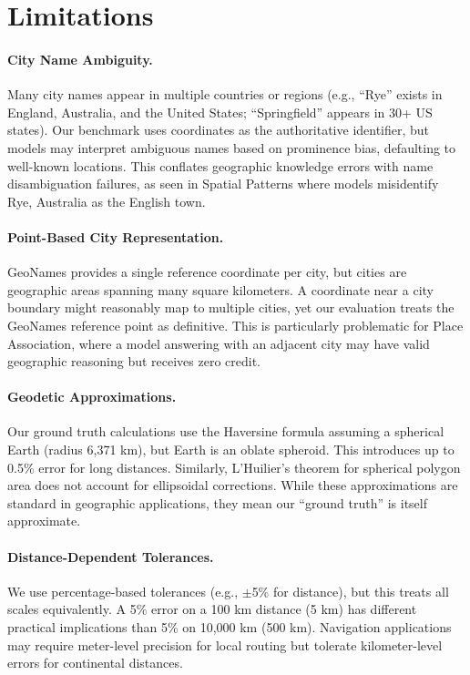 \section{Limitations}
\label{sec:limitations}

\paragraph{City Name Ambiguity.}
Many city names appear in multiple countries or regions (e.g., ``Rye'' exists in England, Australia, and the United States; ``Springfield'' appears in 30+ US states). Our benchmark uses coordinates as the authoritative identifier, but models may interpret ambiguous names based on prominence bias, defaulting to well-known locations. This conflates geographic knowledge errors with name disambiguation failures, as seen in Spatial Patterns where models misidentify Rye, Australia as the English town.

\paragraph{Point-Based City Representation.}
GeoNames provides a single reference coordinate per city, but cities are geographic areas spanning many square kilometers. A coordinate near a city boundary might reasonably map to multiple cities, yet our evaluation treats the GeoNames reference point as definitive. This is particularly problematic for Place Association, where a model answering with an adjacent city may have valid geographic reasoning but receives zero credit.

\paragraph{Geodetic Approximations.}
Our ground truth calculations use the Haversine formula assuming a spherical Earth (radius 6,371 km), but Earth is an oblate spheroid. This introduces up to 0.5\% error for long distances. Similarly, L'Huilier's theorem for spherical polygon area does not account for ellipsoidal corrections. While these approximations are standard in geographic applications, they mean our ``ground truth'' is itself approximate.

\paragraph{Distance-Dependent Tolerances.}
We use percentage-based tolerances (e.g., $\pm$5\% for distance), but this treats all scales equivalently. A 5\% error on a 100 km distance (5 km) has different practical implications than 5\% on 10,000 km (500 km). Navigation applications may require meter-level precision for local routing but tolerate kilometer-level errors for continental distances.

